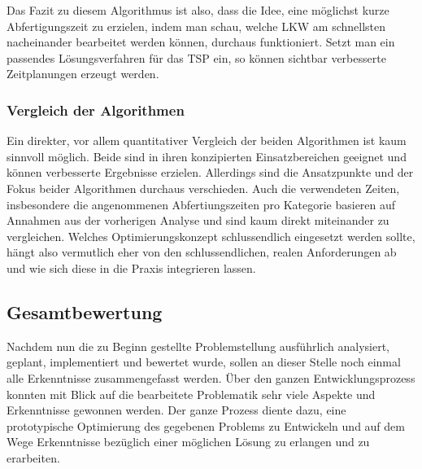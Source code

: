 Das Fazit zu diesem Algorithmus ist also, dass die Idee, eine möglichst kurze Abfertigungszeit zu erzielen, indem man schau, welche LKW am schnellsten nacheinander bearbeitet werden können, durchaus funktioniert. Setzt man ein passendes Lösungsverfahren für das TSP ein, so können sichtbar verbesserte Zeitplanungen erzeugt werden.


\subsubsection{Vergleich der Algorithmen}

Ein direkter, vor allem quantitativer Vergleich der beiden Algorithmen ist kaum sinnvoll möglich. Beide sind in ihren konzipierten Einsatzbereichen geeignet und können verbesserte Ergebnisse erzielen. Allerdings sind die Ansatzpunkte und der Fokus beider Algorithmen durchaus verschieden. Auch die verwendeten Zeiten, insbesondere die angenommenen Abfertiungszeiten pro Kategorie basieren auf Annahmen aus der vorherigen Analyse und sind kaum direkt miteinander zu vergleichen. Welches Optimierungskonzept schlussendlich eingesetzt werden sollte, hängt also vermutlich eher von den schlussendlichen, realen Anforderungen ab und wie sich diese in die Praxis integrieren lassen.


\subsection{Gesamtbewertung}

Nachdem nun die zu Beginn gestellte Problemstellung ausführlich analysiert, geplant, implementiert und bewertet wurde, sollen an dieser Stelle noch einmal alle Erkenntnisse zusammengefasst werden. Über den ganzen Entwicklungsprozess konnten mit Blick auf die bearbeitete Problematik sehr viele Aspekte und Erkenntnisse gewonnen werden. Der ganze Prozess diente dazu, eine prototypische Optimierung des gegebenen Problems zu Entwickeln und auf dem Wege Erkenntnisse bezüglich einer möglichen Lösung zu erlangen und zu erarbeiten. 

